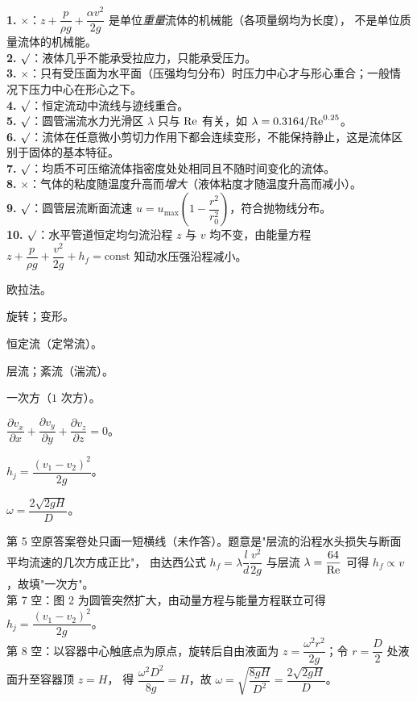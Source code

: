 \begin{tishi}
\textbf{1.} $\times$：$z+\dfrac{p}{\rho g}+\dfrac{\alpha v^2}{2g}$ 是单位\emph{重量}流体的机械能（各项量纲均为长度），
不是单位质量流体的机械能。\\
\textbf{2.} $\surd$：液体几乎不能承受拉应力，只能承受压力。\\
\textbf{3.} $\times$：只有受压面为水平面（压强均匀分布）时压力中心才与形心重合；一般情况下压力中心在形心之下。\\
\textbf{4.} $\surd$：恒定流动中流线与迹线重合。\\
\textbf{5.} $\surd$：圆管湍流水力光滑区 $\lambda$ 只与 $\mathrm{Re}$ 有关，如 $\lambda=0.3164/\mathrm{Re}^{0.25}$。\\
\textbf{6.} $\surd$：流体在任意微小剪切力作用下都会连续变形，不能保持静止，这是流体区别于固体的基本特征。\\
\textbf{7.} $\surd$：均质不可压缩流体指密度处处相同且不随时间变化的流体。\\
\textbf{8.} $\times$：气体的粘度随温度升高而\emph{增大}（液体粘度才随温度升高而减小）。\\
\textbf{9.} $\surd$：圆管层流断面流速 $u=u_{\max}\left(1-\dfrac{r^2}{r_0^2}\right)$，符合抛物线分布。\\
\textbf{10.} $\surd$：水平管道恒定均匀流沿程 $z$ 与 $v$ 均不变，由能量方程 $z+\dfrac{p}{\rho g}+\dfrac{v^2}{2g}+h_f=\text{const}$
知动水压强沿程减小。
\end{tishi}


\begin{ti}
\item 欧拉法。
\item 旋转；变形。
\item 恒定流（定常流）。
\item 层流；紊流（湍流）。
\item 一次方（$1$ 次方）。
\item $\dfrac{\partial v_x}{\partial x}+\dfrac{\partial v_y}{\partial y}+\dfrac{\partial v_z}{\partial z}=0$。
\item $h_j=\dfrac{\left(v_1-v_2\right)^2}{2g}$。
\item $\omega=\dfrac{2\sqrt{2gH}}{D}$。
\end{ti}

\begin{tishi}
第 5 空原答案卷处只画一短横线（未作答）。题意是"层流的沿程水头损失与断面平均流速的几次方成正比"，
由达西公式 $h_f=\lambda\dfrac{l}{d}\dfrac{v^2}{2g}$ 与层流 $\lambda=\dfrac{64}{\mathrm{Re}}$ 可得 $h_f\propto v$，故填"一次方"。\\
第 7 空：图 2 为圆管突然扩大，由动量方程与能量方程联立可得 $h_j=\dfrac{\left(v_1-v_2\right)^2}{2g}$。\\
第 8 空：以容器中心触底点为原点，旋转后自由液面为 $z=\dfrac{\omega^2r^2}{2g}$；令 $r=\dfrac{D}{2}$ 处液面升至容器顶 $z=H$，
得 $\dfrac{\omega^2D^2}{8g}=H$，故 $\omega=\sqrt{\dfrac{8gH}{D^2}}=\dfrac{2\sqrt{2gH}}{D}$。
\end{tishi}

